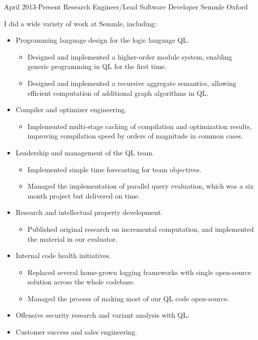 \documentclass[12pt,a4paper,sans]{moderncv}
\begin{document}
\cventry
{April 2013-Present}
{Research Engineer/Lead Software Developer}
{Semmle}
{Oxford}
{}
{
  I did a wide variety of work at Semmle, including:
  \begin{itemize}
    \item Programming language design for the logic language QL.
      \begin{itemize}
      \item Designed and implemented a higher-order module system, enabling generic programming in QL
          for the first time.
      \item Designed and implemented a recursive aggregate semantics, allowing efficient computation of
          additional graph algorithms in QL.
      \end{itemize}
    \item Compiler and optimizer engineering.
      \begin{itemize}
      \item Implemented multi-stage caching of compilation and optimization results,
          improving compilation speed by orders of magnitude in common cases.
      \end{itemize}
    \item Leadership and management of the QL team.
      \begin{itemize}
      \item Implemented simple time forecasting for team objectives.
      \item Managed the implementation of parallel query evaluation, which was a
        six month project but delivered on time.
      \end{itemize}
    \item Research and intellectual property development.
      \begin{itemize}
      \item Published original research on incremental computation, and implemented
          the material in our evaluator.
      \end{itemize}
    \item Internal code health initiatives.
      \begin{itemize}
      \item Replaced several home-grown logging frameworks with single open-source
        solution across the whole codebase.
      \item Managed the process of making most of our QL code open-source.
      \end{itemize}
    \item Offensive security research and variant analysis with QL.
    \item Customer success and sales engineering.
  \end{itemize}
}
\end{document}
